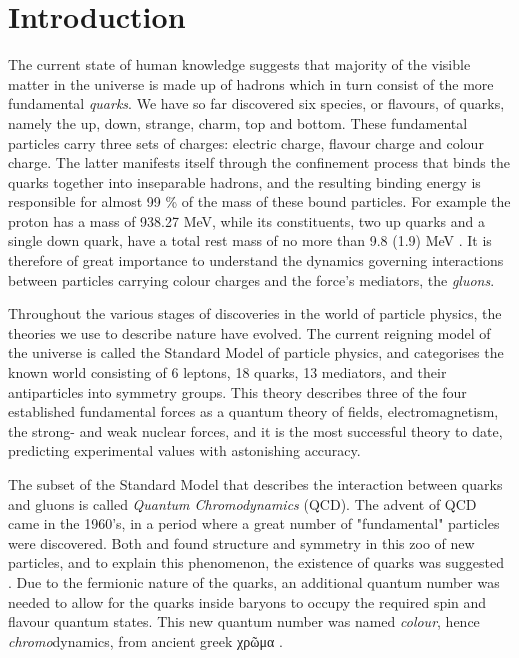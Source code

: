 \chapter{Introduction}

The current state of human knowledge suggests that majority of the visible
matter in the universe is made up of hadrons which in turn consist of
the more fundamental \emph{quarks}. We have so far discovered six species, or
flavours, of quarks, namely the up, down, strange, charm, top and bottom. These
fundamental particles carry three sets of charges: electric charge, flavour
charge and colour charge. The latter manifests itself
through the confinement process that binds the quarks together into inseparable
hadrons, and the resulting binding energy is responsible for almost 99 \% of the
mass of these bound particles. For example the proton has a mass of 938.27 MeV,
while its constituents, two up quarks and a single down quark, have a total rest
mass of no more than 9.8 (1.9) MeV \citep{Agashe:2014kda}. It is therefore of
great importance to understand the dynamics governing interactions between
particles carrying colour charges and the force's mediators, the \emph{gluons}. 

Throughout the various stages of discoveries in the world of particle physics,
the theories we use to describe nature have evolved. The current reigning model
of the universe is called the Standard Model of particle physics, and
categorises the known world consisting of 6 leptons, 18 quarks, 13 mediators,
and their antiparticles into symmetry groups. This theory describes three of
the four established fundamental forces as a quantum theory of fields,
electromagnetism, the strong- and weak nuclear forces, and it is
the most successful theory to date, predicting experimental values with
astonishing accuracy.

The subset of the Standard Model that describes the interaction between quarks
and gluons is called \emph{Quantum Chromodynamics} (QCD). The advent of QCD came
in the 1960's, in a period where a great number of "fundamental" particles were 
discovered. Both \cite{GellMann:1962xb} and \cite{Ne'eman:1961cd} found
structure and symmetry in this zoo of new particles, and to explain this
phenomenon, the existence of quarks was suggested \citep{GellMann:1964nj}.
Due to the fermionic nature of the quarks, an additional quantum number was
needed to allow for the quarks inside baryons to occupy the required spin
and flavour quantum states. This new quantum number was named \emph{colour},
hence \emph{chromo}dynamics, from ancient greek χρῶμα \citep{Greenberg:1964pe}.

